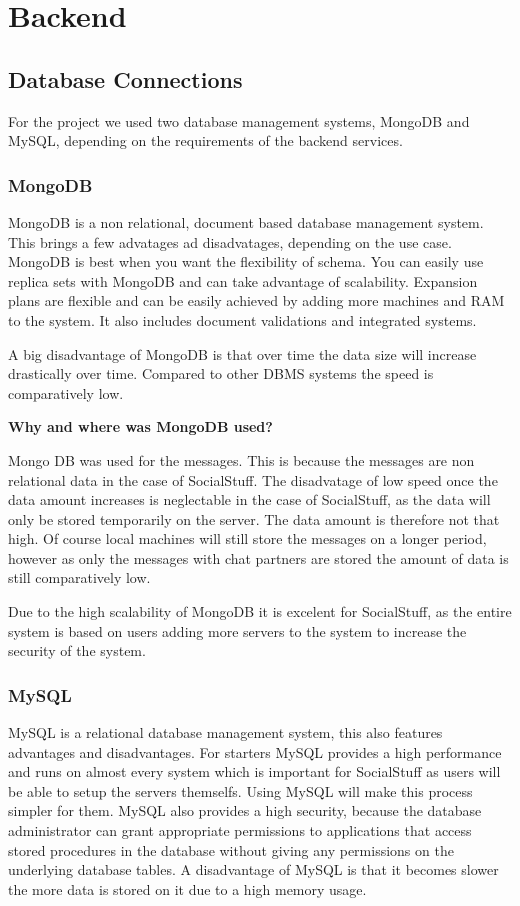 \section{Backend}

\subsection{Database Connections}
For the project we used two database management systems, MongoDB and MySQL, depending on the requirements of the backend services.
\subsubsection{MongoDB}
MongoDB is a non relational, document based database management system. This brings a few advatages ad disadvatages, depending on the use case.
MongoDB is best when you want the flexibility of schema. You can easily use replica sets with MongoDB and can take advantage of scalability. Expansion plans are flexible and can be easily achieved by adding more machines and RAM to the system. It also includes document validations and integrated systems.

A big disadvantage of MongoDB is that over time the data size will increase drastically over time. Compared to other DBMS systems the speed is comparatively low.

\textbf{Why and where was MongoDB used?}

Mongo DB was used for the messages. This is because the messages are non relational data in the case of SocialStuff. The disadvatage of low speed once the data amount increases is neglectable in the case of SocialStuff, as the data will only be stored temporarily on the server. The data amount is therefore not that high. Of course local machines will still store the messages on a longer period, however as only the messages with chat partners are stored the amount of data is still comparatively low.

Due to the high scalability of MongoDB it is excelent for SocialStuff, as the entire system is based on users adding more servers to the system to increase the security of the system.

\subsubsection{MySQL}
MySQL is a relational database management system, this also features advantages and disadvantages. For starters MySQL provides a high performance and runs on almost every system which is important for SocialStuff as users will be able to setup the servers themselfs. Using MySQL will make this process simpler for them.
MySQL also provides a high security, because the database administrator can grant appropriate permissions to applications that access stored procedures in the database without giving any permissions on the underlying database tables.
A disadvantage of MySQL is that it becomes slower the more data is stored on it due to a high memory usage. 

